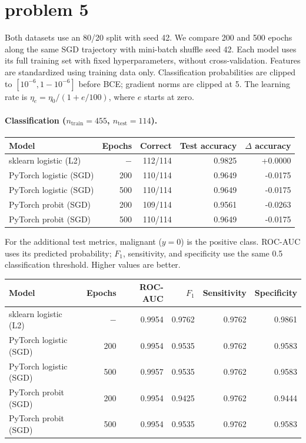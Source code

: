 \clearpage
\section{problem 5}
Both datasets use an 80/20 split with seed 42. We compare 200 and 500 epochs along the same SGD trajectory with mini-batch shuffle seed 42. Each model uses its full training set with fixed hyperparameters, without cross-validation. Features are standardized using training data only. Classification probabilities are clipped to $[10^{-6},1-10^{-6}]$ before BCE; gradient norms are clipped at 5. The learning rate is $\eta_e=\eta_0/(1+e/100)$, where $e$ starts at zero.

\paragraph{Classification ($n_{\mathrm{train}}=455$, $n_{\mathrm{test}}=114$).}
\begin{center}
  \begin{tabular}{lrrrr}
    \hline
    Model & Epochs & Correct & Test accuracy & $\Delta$ accuracy \\
    \hline
    sklearn logistic (L2) & $-$ & 112/114 & 0.9825 & +0.0000 \\
    PyTorch logistic (SGD) & 200 & 110/114 & 0.9649 & -0.0175 \\
    PyTorch logistic (SGD) & 500 & 110/114 & 0.9649 & -0.0175 \\
    PyTorch probit (SGD) & 200 & 109/114 & 0.9561 & -0.0263 \\
    PyTorch probit (SGD) & 500 & 110/114 & 0.9649 & -0.0175 \\
    \hline
  \end{tabular}
\end{center}

For the additional test metrics, malignant ($y=0$) is the positive class. ROC-AUC uses its predicted probability; $F_1$, sensitivity, and specificity use the same 0.5 classification threshold. Higher values are better.

\begin{center}
  \begin{tabular}{lrrrrr}
    \hline
    Model & Epochs & ROC-AUC & $F_1$ & Sensitivity & Specificity \\
    \hline
    sklearn logistic (L2) & $-$ & 0.9954 & 0.9762 & 0.9762 & 0.9861 \\
    PyTorch logistic (SGD) & 200 & 0.9954 & 0.9535 & 0.9762 & 0.9583 \\
    PyTorch logistic (SGD) & 500 & 0.9957 & 0.9535 & 0.9762 & 0.9583 \\
    PyTorch probit (SGD) & 200 & 0.9954 & 0.9425 & 0.9762 & 0.9444 \\
    PyTorch probit (SGD) & 500 & 0.9954 & 0.9535 & 0.9762 & 0.9583 \\
    \hline
  \end{tabular}
\end{center}

